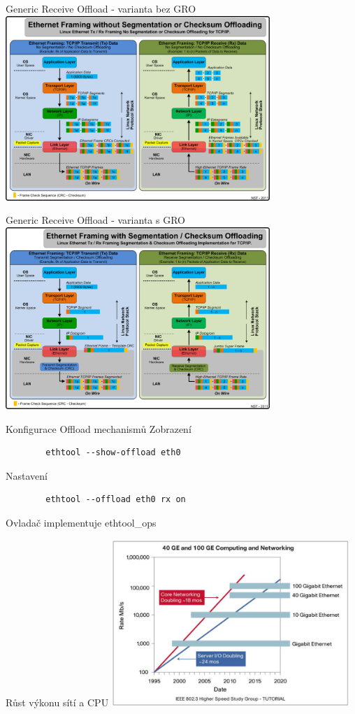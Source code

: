 \documentclass{beamer}
\begin{document}
\begin{frame}{Generic Receive Offload - varianta bez GRO}
	\centering
	\includegraphics[width=10cm,keepaspectratio]{fig/no_segmentation_offloading.png}
\end{frame}

\begin{frame}{Generic Receive Offload - varianta s GRO}
	\centering
	\includegraphics[width=10cm,keepaspectratio]{fig/segmentation_offloading.png}
\end{frame}

\begin{frame}[fragile]{Konfigurace Offload mechanismů}
	Zobrazení
	\begin{lstlisting}
		ethtool --show-offload eth0
	\end{lstlisting}
	Nastavení
	\begin{lstlisting}
		ethtool --offload eth0 rx on
	\end{lstlisting}
	Ovladač implementuje ethtool\_ops
\end{frame}

\begin{frame}{Růst výkonu sítí a CPU}
	\centering
	\includegraphics[width=9cm,keepaspectratio]{fig/performance-gap.png}
\end{frame}
\end{document}
